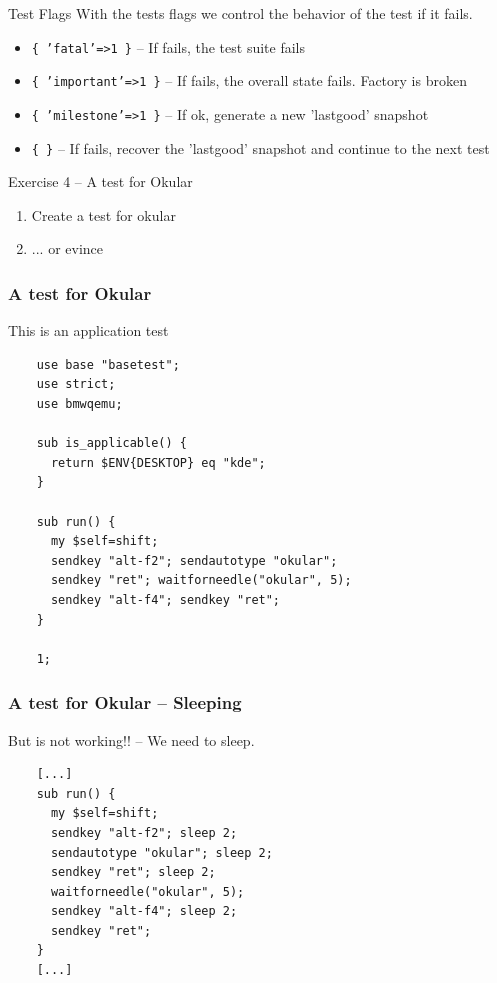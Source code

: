 \documentclass{beamer}
\begin{document}
\begin{frame}{Test Flags}
  With the tests flags we control the behavior of the test if it fails.
  \begin{itemize}
  \item \texttt{\{ 'fatal'=>1 \}} -- If fails, the test suite fails
  \item \texttt{\{ 'important'=>1 \}} -- If fails, the overall state fails. Factory is broken
  \item \texttt{\{ 'milestone'=>1 \}} -- If ok, generate a new 'lastgood' snapshot
  \item \texttt{\{ \}} -- If fails, recover the 'lastgood' snapshot and continue to the next test
  \end{itemize}
\end{frame}


%
%
\begin{frame}{Exercise 4 -- A test for Okular}
  \begin{enumerate}
  \item Create a test for okular
  \item ... or evince 
  \end{enumerate}
\end{frame}


\begin{frame}[fragile]
  \frametitle{A test for Okular}
  This is an application test
  \lstset{style=myperl}
  \begin{lstlisting}
    use base "basetest";
    use strict;
    use bmwqemu;

    sub is_applicable() {
      return $ENV{DESKTOP} eq "kde";
    }

    sub run() {
      my $self=shift;
      sendkey "alt-f2"; sendautotype "okular";
      sendkey "ret"; waitforneedle("okular", 5);
      sendkey "alt-f4"; sendkey "ret";
    }

    1;
  \end{lstlisting}
\end{frame}

\begin{frame}[fragile]
  \frametitle{A test for Okular -- Sleeping}
  But is not working!! -- We need to sleep.
  \lstset{style=myperl}
  \begin{lstlisting}
    [...]
    sub run() {
      my $self=shift;
      sendkey "alt-f2"; sleep 2;
      sendautotype "okular"; sleep 2;
      sendkey "ret"; sleep 2;
      waitforneedle("okular", 5);
      sendkey "alt-f4"; sleep 2;
      sendkey "ret";
    }
    [...]
  \end{lstlisting}
\end{frame}
\end{document}
